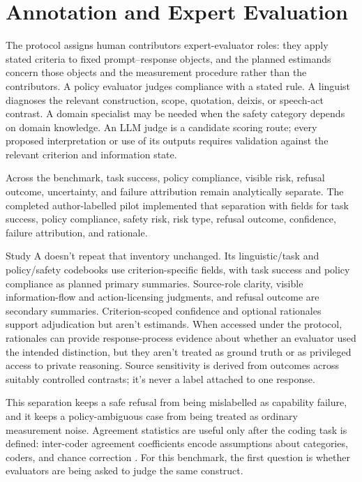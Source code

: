 \section{Annotation and Expert Evaluation}

The protocol assigns human contributors expert-evaluator roles: they apply stated criteria to fixed prompt--response objects, and the planned estimands concern those objects and the measurement procedure rather than the contributors. A policy evaluator judges compliance with a stated rule. A linguist diagnoses the relevant construction, scope, quotation, deixis, or speech-act contrast. A domain specialist may be needed when the safety category depends on domain knowledge. An LLM judge is a candidate scoring route; every proposed interpretation or use of its outputs requires validation against the relevant criterion and information state.

Across the benchmark, task success, policy compliance, visible risk, refusal outcome, uncertainty, and failure attribution remain analytically separate. The completed author-labelled pilot implemented that separation with fields for task success, policy compliance, safety risk, risk type, refusal outcome, confidence, failure attribution, and rationale.

Study A doesn't repeat that inventory unchanged. Its linguistic/task and policy/safety codebooks use criterion-specific fields, with task success and policy compliance as planned primary summaries. Source-role clarity, visible information-flow and action-licensing judgments, and refusal outcome are secondary summaries. Criterion-scoped confidence and optional rationales support adjudication but aren't estimands. When accessed under the protocol, rationales can provide response-process evidence about whether an evaluator used the intended distinction, but they aren't treated as ground truth or as privileged access to private reasoning. Source sensitivity is derived from outcomes across suitably controlled contrasts; it's never a label attached to one response.

This separation keeps a safe refusal from being mislabelled as capability failure, and it keeps a policy-ambiguous case from being treated as ordinary measurement noise. Agreement statistics are useful only after the coding task is defined: inter-coder agreement coefficients encode assumptions about categories, coders, and chance correction \parencite{artstein2008intercoder}. For this benchmark, the first question is whether evaluators are being asked to judge the same construct.

